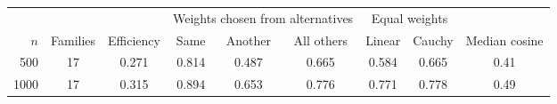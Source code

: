 \begin{tabular}{rcccccccc}
\toprule
 & & & \multicolumn{3}{c}{Weights chosen from alternatives} & \multicolumn{2}{c}{Equal weights} & \\
\cmidrule(lr){4-6}\cmidrule(lr){7-8}
$n$ & Families & Efficiency & Same & Another & All others & Linear & Cauchy & Median cosine \\
\midrule
500 & 17 & 0.271 & 0.814 & 0.487 & 0.665 & 0.584 & 0.665 & 0.41 \\
1000 & 17 & 0.315 & 0.894 & 0.653 & 0.776 & 0.771 & 0.778 & 0.49 \\
\bottomrule
\end{tabular}